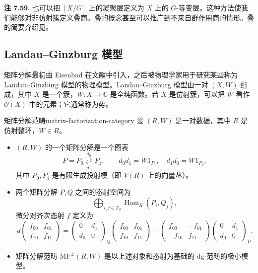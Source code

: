 \begin{note}\label{note:stacks-equivariant-sheaves}
\textbf{注 7.59.} 也可以把 $[X/G]$ 上的凝聚层定义为 $X$ 上的 $G$-等变层。这种方法使我们能够对非仿射簇定义叠商。叠的概念甚至可以推广到不来自群作用商的情形。叠的简要介绍见。
\end{note}

\subsection{Landau--Ginzburg 模型}\label{subsec:landau-ginzburg-models}
矩阵分解最初由 Eisenbud 在文献中引入，之后被物理学家用于研究某些称为 Landau--Ginzburg 模型的物理模型。Landau--Ginzburg 模型由一对 $(X,W)$ 组成，其中 $X$ 是一个簇，$W\colon X\to\mathbb C$ 是全纯函数。若 $X$ 是仿射簇，可以把 $W$ 看作 $\mathcal O(X)$ 中的元素；它通常称为势。

\begin{definition}{矩阵分解范畴}{matrix-factorization-category}
设 $(R,W)$ 是一对数据，其中 $R$ 是仿射整环，$W\in R$。
\begin{itemize}
  \item $(R,W)$ 的一个矩阵分解是一个图表
  \[
    P=P_0\underset{d_1}{\overset{d_0}{\rightleftarrows}}P_1,
    \qquad d_0d_1=W1_{P_1},\quad d_1d_0=W1_{P_0},
  \]
  其中 $P_0,P_1$ 是有限生成投射模（即 $V(R)$ 上的向量丛）。
  \item 两个矩阵分解 $P,Q$ 之间的态射空间为
  \[
    \bigoplus_{i,j\in\mathbb Z_2}\operatorname{Hom}_R(P_i,Q_j),
  \]
  微分对齐次态射 $f$ 定义为
  \[
    d\begin{pmatrix}f_{00}&f_{01}\\f_{10}&f_{11}\end{pmatrix}
    =\begin{pmatrix}0&d_1\\d_0&0\end{pmatrix}_{Q}
      \begin{pmatrix}f_{00}&f_{01}\\f_{10}&f_{11}\end{pmatrix}
      -\begin{pmatrix}f_{00}&-f_{01}\\-f_{10}&f_{11}\end{pmatrix}
       \begin{pmatrix}0&d_1\\d_0&0\end{pmatrix}_{P}.
  \]
  \item 矩阵分解范畴 $\mathrm{MF}^{\pm}(R,W)$ 是以上述对象和态射为基础的 dg-范畴的极小模型。
\end{itemize}
\end{definition}

